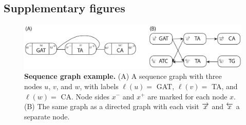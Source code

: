 \documentclass[11pt]{ucscthesis}
\newcommand{\nodelabel}[1]{\ensuremath{\ell\left( #1 \right)}}
\newcommand{\leftside}[1]{\ensuremath{{ #1 }^{-}}}
\newcommand{\rightside}[1]{\ensuremath{{ #1 }^{+}}}
\newcommand{\forwardnode}[1]{\ensuremath{\protect\overrightarrow{ #1 }}}
\newcommand{\reversenode}[1]{\ensuremath{\protect\overleftarrow{ #1 }}}
\begin{document}
\subsection{Supplementary figures}

\begin{figure}[H]
    \centering
    \includegraphics[width=\linewidth]{aim2_supplement_graph_example.pdf}
    \caption[Sequence graph example]{\textbf{Sequence graph example.}
      (A) A sequence graph with three nodes $u$, $v$, and $w$, with labels $\nodelabel{u} =$ GAT, $\nodelabel{v} =$ TA, and $\nodelabel{w} =$ CA. Node sides $\leftside{x}$ and $\rightside{x}$ are marked for each node $x$.
      (B) The same graph as a directed graph with each visit $\forwardnode{x}$ and $\reversenode{x}$ a separate node.
    }
    \label{fig:aim2_supplement_graph-example}
    \label{fig:first}
\end{figure}
\end{document}
